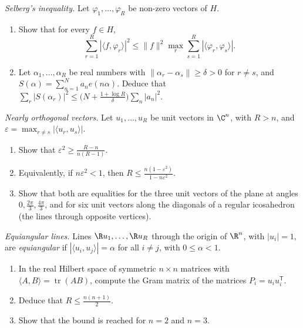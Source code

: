 \begin{exercise}[$\star$]\label{pb:selberg}
\emph{Selberg's inequality.} Let $\varphi_1,\dots,\varphi_R$ be non-zero vectors of $H$.
\begin{enumerate}[label=(\alph*)]
\item Show that for every $f\in H$,
\[
\sum_{r=1}^R|\langle f,\varphi_r\rangle|^2\le\|f\|^2\max_{r}\sum_{s=1}^R|\langle\varphi_r,\varphi_s\rangle|.
\]
\item Let $\alpha_1,\dots,\alpha_R$ be real numbers with $\|\alpha_r-\alpha_s\|\ge\delta>0$ for $r\ne s$, and $S(\alpha)=\sum_{n=1}^Na_ne(n\alpha)$.
Deduce that $\sum_r|S(\alpha_r)|^2\le\bigl(N+\frac{1+\log R}\delta\bigr)\sum_n|a_n|^2$.
\end{enumerate}
\end{exercise}

\begin{exercise}[$\star\star$]\label{pb:welch}
\emph{Nearly orthogonal vectors.} Let $u_1,\dots,u_R$ be unit vectors in $\C^n$, with $R>n$, and $\varepsilon=\max_{r\ne s}|\langle u_r,u_s\rangle|$.
\begin{enumerate}[label=(\alph*)]
\item Show that $\varepsilon^2\ge\frac{R-n}{n(R-1)}$.
\item Equivalently, if $n\varepsilon^2<1$, then $R\le\frac{n(1-\varepsilon^2)}{1-n\varepsilon^2}$.
\item Show that both are equalities for the three unit vectors of the plane at angles $0,\frac{2\pi}3,\frac{4\pi}3$, and for six unit vectors
along the diagonals of a regular icosahedron (the lines through opposite vertices).
\end{enumerate}
\end{exercise}

\begin{exercise}[$\star\star$]\label{pb:gerzon}
\emph{Equiangular lines.} Lines $\R u_1,\dots,\R u_R$ through the origin of $\R^n$, with $|u_i|=1$, are \emph{equiangular} if
$|\langle u_i,u_j\rangle|=\alpha$ for all $i\ne j$, with $0\le\alpha<1$.
\begin{enumerate}[label=(\alph*)]
\item In the real Hilbert space of symmetric $n\times n$ matrices with $\langle A,B\rangle=\operatorname{tr}(AB)$, compute the Gram matrix of the
matrices $P_i=u_iu_i^{\mathsf T}$.
\item Deduce that $R\le\frac{n(n+1)}2$.
\item Show that the bound is reached for $n=2$ and $n=3$.
\end{enumerate}
\end{exercise}

